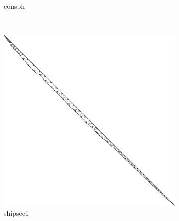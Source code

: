 \begin{figure}
\begin{multicols}{3}
\begin{subfigure}{\linewidth}
\caption{consph}
\end{subfigure}~%
\end{multicols}
\begin{multicols}{3}
\begin{subfigure}{\linewidth}
\includegraphics[width=\linewidth]{images/shipsec1}
\caption{shipsec1}
\end{subfigure}~%
\begin{subfigure}{\linewidth}

\end{subfigure}
\end{multicols}
\end{figure}
